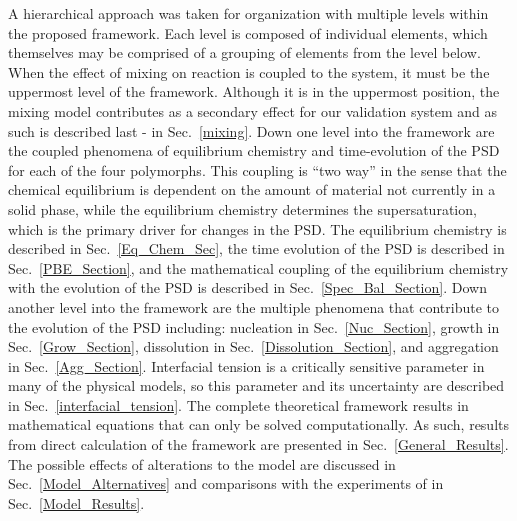\documentclass[preprint,3p,a4paper,times,12pt,authoryear]{elsarticle}
\begin{document}
A hierarchical approach was taken for organization with multiple levels within the proposed framework.  Each level is composed of individual elements, which themselves may be comprised of a grouping of elements from the level below.  
When the effect of mixing on reaction is coupled to the system, it must be the uppermost level of the framework.  Although it is in the uppermost position, the mixing model contributes as a secondary effect for our validation system and as such is described last - in Sec.~\ref{mixing}.  Down one level into the framework are the coupled phenomena of equilibrium chemistry and time-evolution of the PSD for each of the four polymorphs. This coupling is ``two way'' in the sense that the chemical equilibrium is dependent on the amount of material not currently in a solid phase, while the equilibrium chemistry determines the supersaturation, which is the primary driver for changes in the PSD. The equilibrium chemistry is described in Sec.~\ref{Eq_Chem_Sec}, the time evolution of the PSD is described in Sec.~\ref{PBE_Section}, and the mathematical coupling of the equilibrium chemistry with the evolution of the PSD is described in Sec.~\ref{Spec_Bal_Section}. Down another level into the framework are the multiple phenomena that contribute to the evolution of the PSD including: nucleation in Sec.~\ref{Nuc_Section}, growth in Sec.~\ref{Grow_Section}, dissolution in Sec.~\ref{Dissolution_Section}, and aggregation in Sec.~\ref{Agg_Section}. Interfacial tension is a critically sensitive parameter in many of the physical models, so this parameter and its uncertainty are described in Sec.~\ref{interfacial_tension}. The complete theoretical framework results in mathematical equations that can only be solved computationally.  As such, results from direct calculation of the framework are presented in Sec.~\ref{General_Results}.  The possible effects of alterations to the model are discussed in Sec.~\ref{Model_Alternatives} and comparisons with the experiments of \cite{Ogino1987} in Sec.~\ref{Model_Results}.
\end{document}
